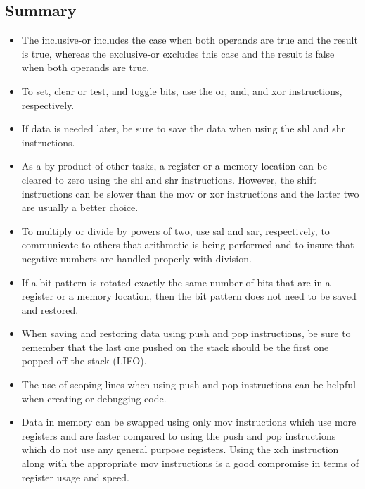 \documentclass[10pt]{book}
\begin{document}
\subsection{Summary}
\begin{itemize}
  \item The inclusive-or includes the case when both operands are true and the result is true, whereas the exclusive-or excludes this case and the result is false when both operands are true.
  \item To set, clear or test, and toggle bits, use the or, and, and xor instructions, respectively.
  \item If data is needed later, be sure to save the data when using the shl and shr instructions.
  \item As a by-product of other tasks, a register or a memory location can be cleared to zero using the shl and shr instructions. However, the shift instructions can be slower than the mov or xor instructions and the latter two are usually a better choice.
  \item To multiply or divide by powers of two, use sal and sar, respectively, to communicate to others that arithmetic is being performed and to insure that negative numbers are handled properly with division.
  \item If a bit pattern is rotated exactly the same number of bits that are in a register or a memory location, then the bit pattern does not need to be saved and restored.
  \item When saving and restoring data using push and pop instructions, be sure to remember that the last one pushed on the stack should be the first one popped off the stack (LIFO).
  \item The use of scoping lines when using push and pop instructions can be helpful when creating or debugging code.
  \item Data in memory can be swapped using only mov instructions which use more registers and are faster compared to using the push and pop instructions which do not use any general purpose registers. Using the xch instruction along with the appropriate mov instructions is a good compromise in terms of register usage and speed.
\end{itemize}


\end{document}
